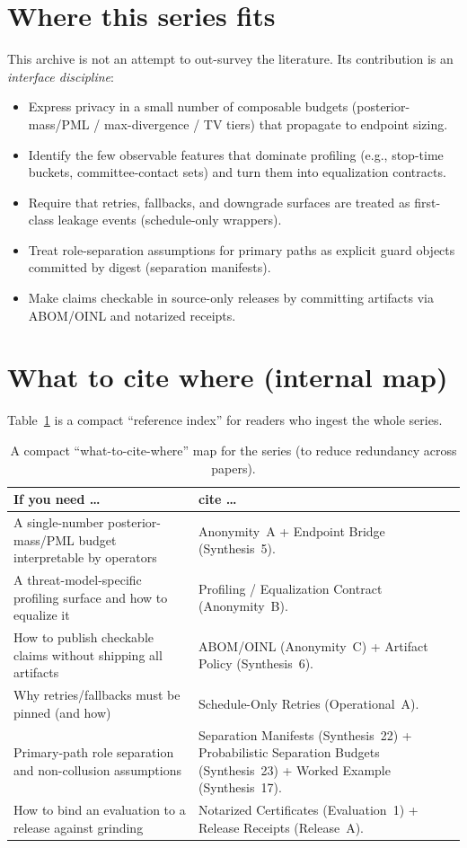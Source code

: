 \documentclass[11pt]{article}
\begin{document}
\section{Where this series fits}
This archive is not an attempt to out-survey the literature.
Its contribution is an \emph{interface discipline}:
\begin{itemize}[leftmargin=1.2em]
\item Express privacy in a small number of composable budgets (posterior-mass/PML / max-divergence / TV tiers) that propagate to endpoint sizing.\cite{series:oddsinflation,series:endpointbridge}
\item Identify the few observable features that dominate profiling (e.g., stop-time buckets, committee-contact sets) and turn them into equalization contracts.\cite{series:profiling}
\item Require that retries, fallbacks, and downgrade surfaces are treated as first-class leakage events (schedule-only wrappers).\cite{series:operationalA}
\item Treat role-separation assumptions for primary paths as explicit guard objects committed by digest (separation manifests).\cite{series:primarysepmanifest}
\item Make claims checkable in source-only releases by committing artifacts via ABOM/OINL and notarized receipts.\cite{series:abomoinl,series:releaseproperty}
\end{itemize}

\section{What to cite where (internal map)}
Table~\ref{tab:map} is a compact ``reference index'' for readers who ingest the whole series.

\begin{table}[t]
\centering
\begin{tabularx}{\linewidth}{@{}lX@{}}
\toprule
If you need \dots & cite \dots \\
\midrule
A single-number posterior-mass/PML budget interpretable by operators & Anonymity~A + Endpoint Bridge (Synthesis~5). \\
A threat-model-specific profiling surface and how to equalize it & Profiling / Equalization Contract (Anonymity~B). \\
How to publish checkable claims without shipping all artifacts & ABOM/OINL (Anonymity~C) + Artifact Policy (Synthesis~6). \\
Why retries/fallbacks must be pinned (and how) & Schedule-Only Retries (Operational~A). \\
Primary-path role separation and non-collusion assumptions & Separation Manifests (Synthesis~22) + Probabilistic Separation Budgets (Synthesis~23) + Worked Example (Synthesis~17). \\
How to bind an evaluation to a release against grinding & Notarized Certificates (Evaluation~1) + Release Receipts (Release~A). \\
\bottomrule
\end{tabularx}
\caption{A compact ``what-to-cite-where'' map for the series (to reduce redundancy across papers).}
\label{tab:map}
\end{table}
\end{document}
